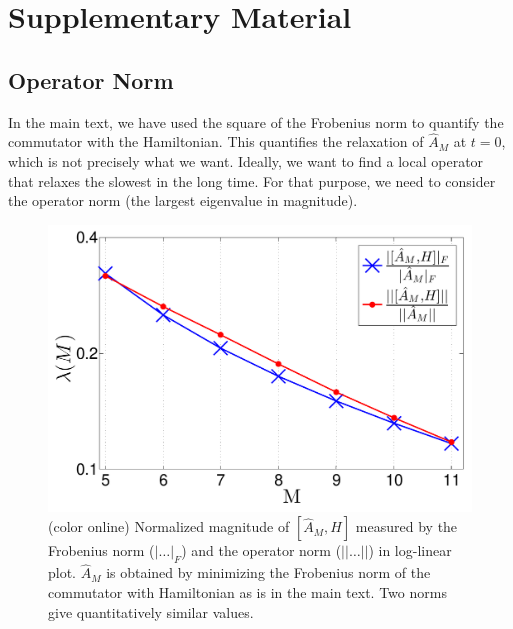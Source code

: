 \documentclass[twocolumn,superscriptaddress, prb]{revtex4-1}
\begin{document}
\section*{Supplementary Material}

\subsection{Operator Norm}
In the main text, we have used the square of the Frobenius norm to quantify the commutator with the Hamiltonian.
This quantifies the relaxation of $\hat{A}_M$ at $t = 0$,
which is not precisely what we want. Ideally, we want to find a local operator
that relaxes the slowest in the long time.
For that purpose, we need to consider the operator norm (the largest eigenvalue in magnitude).

\begin{figure}
\includegraphics[width=1.0\linewidth]{infinite_ham_opnorm.pdf}
\centering
\caption{(color online) Normalized magnitude of $[\hat{A}_M, H]$ measured by the Frobenius norm ($|\ldots|_F$) and the operator norm ($||\ldots||$)
in log-linear plot.
$\hat{A}_M$ is obtained by minimizing the Frobenius norm of the commutator with Hamiltonian as is in the main text.
Two norms give quantitatively similar values.
}
\label{fig:op_norm}
\end{figure}
\end{document}
